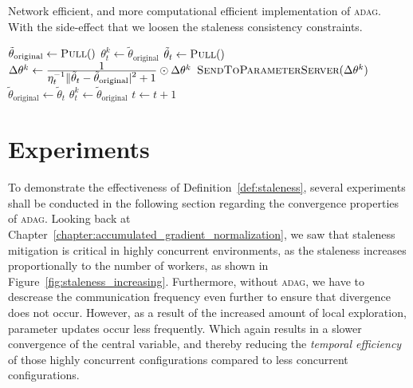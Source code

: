 \begin{algorithm}[H]
  \caption{Network efficient, and more computational efficient implementation of \textsc{adag}. With the side-effect that we loosen the staleness consistency constraints.}
  \label{algo:adag_3}
  \begin{algorithmic}[1]
    \State $\tilde{\theta}_\text{original} \gets \Call{Pull}$ 
    \State $\theta^k_t \gets \tilde{\theta}_\text{original}$
    \State
     
    \State $\tilde{\theta}_t \gets \Call{Pull}$
    \State $\Delta\theta^k \gets \frac{\displaystyle 1}{\displaystyle \eta_t^{-1}\|\tilde{\theta}_t - \tilde{\theta}_\text{original}|^2 + 1} \odot \Delta\theta^k$
    \State $\Call{SendToParameterServer}{\Delta\theta^k}$
    \State $\tilde{\theta}_\text{original} \gets \tilde{\theta}_t$
    \State $\theta^k_t \gets \tilde{\theta}_\text{original}$
    \State $t \gets t + 1$
    \EndProcedure
    \State
    \EndProcedure
  \end{algorithmic}
\end{algorithm}

\section{Experiments}
\label{sec:adag_experiments}

To demonstrate the effectiveness of Definition~\ref{def:staleness}, several experiments shall be conducted in the following section regarding the convergence properties of \textsc{adag}. Looking back at Chapter~\ref{chapter:accumulated_gradient_normalization}, we saw that staleness mitigation is critical in highly concurrent environments, as the staleness increases proportionally to the number of workers, as shown in Figure~\ref{fig:staleness_increasing}. Furthermore, without \textsc{adag}, we have to descrease the communication frequency even further to ensure that divergence does not occur. However, as a result of the increased amount of local exploration, parameter updates occur less frequently. Which again results in a slower convergence of the central variable, and thereby reducing the \emph{temporal efficiency} of those highly concurrent configurations compared to less concurrent configurations.\\

